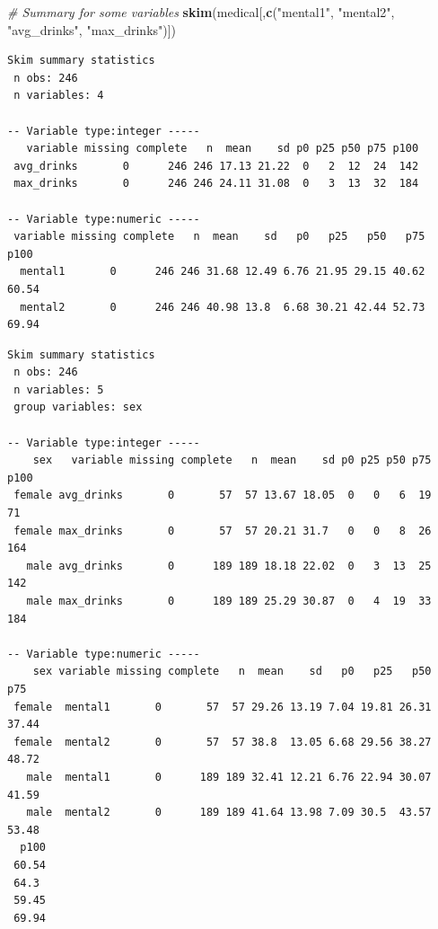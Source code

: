 \documentclass[]{book}
\newenvironment{Shaded}{\begin{snugshade}}{\end{snugshade}}
\newcommand{\CommentTok}[1]{\textcolor[rgb]{0.56,0.35,0.01}{\textit{#1}}}
\newcommand{\KeywordTok}[1]{\textcolor[rgb]{0.13,0.29,0.53}{\textbf{#1}}}
\newcommand{\NormalTok}[1]{#1}
\newcommand{\OperatorTok}[1]{\textcolor[rgb]{0.81,0.36,0.00}{\textbf{#1}}}
\newcommand{\StringTok}[1]{\textcolor[rgb]{0.31,0.60,0.02}{#1}}
\begin{document}
\begin{Shaded}
\begin{Highlighting}[]
\CommentTok{# Summary for some variables}
\KeywordTok{skim}\NormalTok{(medical[,}\KeywordTok{c}\NormalTok{(}\StringTok{"mental1"}\NormalTok{, }\StringTok{"mental2"}\NormalTok{, }\StringTok{"avg_drinks"}\NormalTok{, }\StringTok{"max_drinks"}\NormalTok{)])}
\end{Highlighting}
\end{Shaded}

\begin{verbatim}
Skim summary statistics
 n obs: 246 
 n variables: 4 

-- Variable type:integer -----
   variable missing complete   n  mean    sd p0 p25 p50 p75 p100
 avg_drinks       0      246 246 17.13 21.22  0   2  12  24  142
 max_drinks       0      246 246 24.11 31.08  0   3  13  32  184

-- Variable type:numeric -----
 variable missing complete   n  mean    sd   p0   p25   p50   p75  p100
  mental1       0      246 246 31.68 12.49 6.76 21.95 29.15 40.62 60.54
  mental2       0      246 246 40.98 13.8  6.68 30.21 42.44 52.73 69.94
\end{verbatim}

\begin{Shaded}
\end{Shaded}

\begin{verbatim}
Skim summary statistics
 n obs: 246 
 n variables: 5 
 group variables: sex 

-- Variable type:integer -----
    sex   variable missing complete   n  mean    sd p0 p25 p50 p75 p100
 female avg_drinks       0       57  57 13.67 18.05  0   0   6  19   71
 female max_drinks       0       57  57 20.21 31.7   0   0   8  26  164
   male avg_drinks       0      189 189 18.18 22.02  0   3  13  25  142
   male max_drinks       0      189 189 25.29 30.87  0   4  19  33  184

-- Variable type:numeric -----
    sex variable missing complete   n  mean    sd   p0   p25   p50   p75
 female  mental1       0       57  57 29.26 13.19 7.04 19.81 26.31 37.44
 female  mental2       0       57  57 38.8  13.05 6.68 29.56 38.27 48.72
   male  mental1       0      189 189 32.41 12.21 6.76 22.94 30.07 41.59
   male  mental2       0      189 189 41.64 13.98 7.09 30.5  43.57 53.48
  p100
 60.54
 64.3 
 59.45
 69.94
\end{verbatim}
\end{document}
